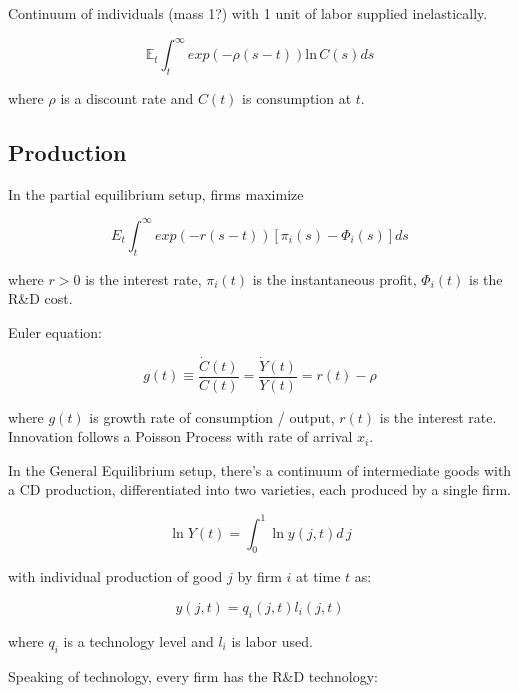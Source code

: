 \documentclass[11pt]{article}
\begin{document}
  Continuum of individuals (mass 1?) with 1 unit of labor supplied inelastically.

  \begin{equation} \label{eq:pref}
    \mathbb{E}_t \int_t^\infty exp(-\rho(s - t))\mathrm{ln}\,   C(s)ds
  \end{equation}

  where $\rho$ is a discount rate and $C(t)$ is consumption at $t$.

\subsection{Production}
\label{sub:production}

  In the partial equilibrium setup, firms maximize

  \begin{equation}
    E_t \int_t^\infty exp(-r(s - t))[\pi_i(s) - \Phi_i(s)]ds
  \end{equation}

  where $r > 0$ is the interest rate, $\pi_i(t)$ is the instantaneous profit, $\Phi_i(t)$ is the R\&D cost.

  Euler equation:

  \begin{equation}
    g(t) \equiv \frac{\dot{C}(t)}{C(t)} = \frac{\dot{Y}(t)}{Y(t)} = r(t) - \rho
  \end{equation}

  where $g(t)$ is growth rate of consumption / output, $r(t)$ is the interest rate.
  Innovation follows a Poisson Process with rate of arrival $x_i$.

  In the General Equilibrium setup, there's a continuum of intermediate goods with a CD production, differentiated into two varieties, each produced by a single firm.

  \begin{equation} \label{eq:tech_output}
    \ln Y(t) = \int_{0}^{1} \ln y(j, t) d\,j 
  \end{equation}

  with individual production of good $j$ by firm $i$ at time $t$ as:

  \begin{equation}
    y(j, t) = q_i(j, t)l_i(j, t)
  \end{equation}

  where $q_i$ is a technology level and $l_i$ is labor used.

  Speaking of technology, every firm has the R\&D technology:
\end{document}
